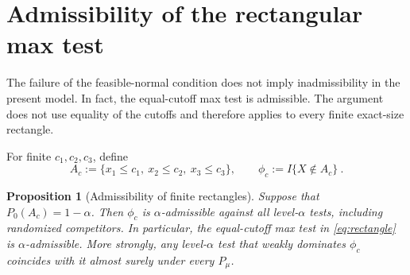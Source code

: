 \documentclass[12pt]{article}
\newtheorem{proposition}{Proposition}
\theoremstyle{remark}
\begin{document}
\section{Admissibility of the rectangular max test}

The failure of the feasible-normal condition does not imply inadmissibility in
the present model.  In fact, the equal-cutoff max test is admissible.  The
argument does not use equality of the cutoffs and therefore applies to every
finite exact-size rectangle.

For finite $c_1,c_2,c_3$, define
\begin{equation}\label{eq:general-rectangle}
A_c
:=
\{x_1\le c_1,\ x_2\le c_2,\ x_3\le c_3\},
\qquad
\phi_c:=I\{X\notin A_c\}~.
\end{equation}

\begin{proposition}[Admissibility of finite rectangles]
\label{prop:rectangle-admissibility}
Suppose that $P_0(A_c)=1-\alpha$.  Then $\phi_c$ is
$\alpha$-admissible against all level-$\alpha$ tests, including randomized
competitors.  In particular, the equal-cutoff max test in
\eqref{eq:rectangle} is $\alpha$-admissible.  More strongly, any
level-$\alpha$ test that weakly dominates $\phi_c$ coincides with it almost
surely under every $P_\mu$.
\end{proposition}
\end{document}
